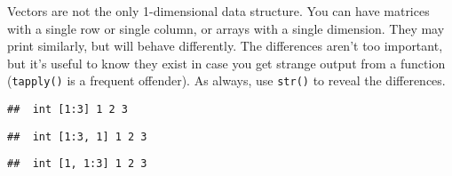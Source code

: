 Vectors are not the only 1-dimensional data structure. You can have
matrices with a single row or single column, or arrays with a single
dimension. They may print similarly, but will behave differently. The
differences aren't too important, but it's useful to know they exist in
case you get strange output from a function (\texttt{tapply()} is a
frequent offender). As always, use \texttt{str()} to reveal the
differences. 

\begin{Shaded}
\begin{Highlighting}[]
\NormalTok{(}\OperatorTok{:}\NormalTok{)                   }
\end{Highlighting}
\end{Shaded}

\begin{verbatim}
##  int [1:3] 1 2 3
\end{verbatim}

\begin{Shaded}
\begin{Highlighting}[]
\NormalTok{(}\NormalTok{(}\OperatorTok{:}\NormalTok{, } \NormalTok{)) }
\end{Highlighting}
\end{Shaded}

\begin{verbatim}
##  int [1:3, 1] 1 2 3
\end{verbatim}

\begin{Shaded}
\begin{Highlighting}[]
\NormalTok{(}\NormalTok{(}\OperatorTok{:}\NormalTok{, } \NormalTok{)) }
\end{Highlighting}
\end{Shaded}

\begin{verbatim}
##  int [1, 1:3] 1 2 3
\end{verbatim}

\begin{Shaded}
\begin{Highlighting}[]
\NormalTok{(}\NormalTok{(}\OperatorTok{:}\NormalTok{, }\NormalTok{))         }
\end{Highlighting}
\end{Shaded}

